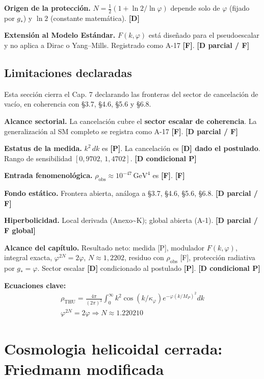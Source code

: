 ﻿\documentclass[11pt,letterpaper]{article}
\begin{document}
\textbf{Origen de la protección.} $N = \frac{1}{2}(1 + \ln 2/\ln\varphi)$ depende solo de $\varphi$ (fijado por $g_*$) y $\ln 2$ (constante matemática). \textbf{[D]}

\textbf{Extensión al Modelo Estándar.} $F(k, \varphi)$ está diseñado para el pseudoescalar y no aplica a Dirac o Yang--Mills. Registrado como A-17 \textbf{[F]}. \textbf{[D parcial / F]}
\subsection{Limitaciones declaradas}
Esta sección cierra el Cap. 7 declarando las fronteras del sector de cancelación de vacío, en coherencia con §3.7, §4.6, §5.6 y §6.8.

\textbf{Alcance sectorial.} La cancelación cubre el \textbf{sector escalar de coherencia}. La generalización al SM completo se registra como A-17 \textbf{[F]}. \textbf{[D parcial / F]}

\textbf{Estatus de la medida.} $k^2\,dk$ es \textbf{[P]}. La cancelación es \textbf{[D] dado el postulado}. Rango de sensibilidad $[0{,}9702,\,1{,}4702]$. \textbf{[D condicional P]}

\textbf{Entrada fenomenológica.} $\rho_{\text{obs}} \approx 10^{-47}\,\text{GeV}^4$ es \textbf{[F]}. \textbf{[F]}

\textbf{Fondo estático.} Frontera abierta, análoga a §3.7, §4.6, §5.6, §6.8. \textbf{[D parcial / F]}

\textbf{Hiperbolicidad.} Local derivada (Anexo\textasciitilde{}K); global abierta (A-1). \textbf{[D parcial / F global]}

\textbf{Alcance del capítulo.} Resultado neto: medida [P], modulador $F(k, \varphi)$, integral exacta, $\varphi^{2N} = 2\varphi$, $N \approx 1{,}2202$, residuo con $\rho_{\text{obs}}$ [F], protección radiativa por $g_* = \varphi$. Sector escalar \textbf{[D]} condicionado al postulado \textbf{[P]}. \textbf{[D condicional P]}

\textbf{Ecuaciones clave:}
\begin{align*}
    \rho_{\mathrm{THU}} = \frac{4\pi}{(2\pi)^3}\int_0^\infty k^2 \cos(k/\kappa_\varphi) e^{-\varphi(k/M_P)^2} dk \\
    \varphi^{2N} = 2\varphi \Rightarrow N \approx 1.220210
\end{align*}
\section{Cosmologia helicoidal cerrada: Friedmann modificada}
\end{document}
